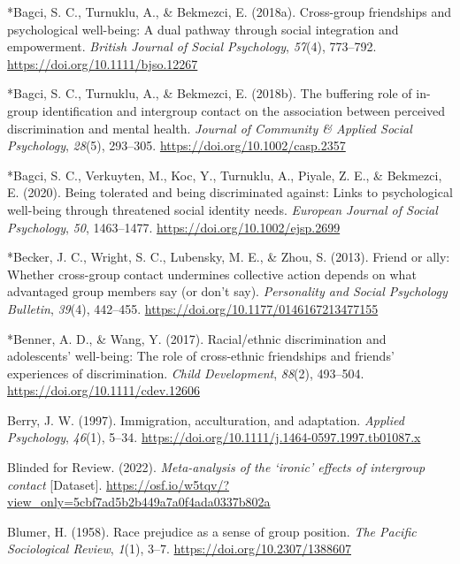 \documentclass[12pt, letterpaper]{article}
\newenvironment{CSLReferences}[2]{}{}
\begin{document}
\begin{CSLReferences}{1}{0}
\leavevmode\hypertarget{ref-414}{}%
*Bagci, S. C., Turnuklu, A., \& Bekmezci, E. (2018a). Cross-group
friendships and psychological well-being: {A} dual pathway through
social integration and empowerment. \emph{British Journal of Social
Psychology}, \emph{57}(4), 773--792.
\url{https://doi.org/10.1111/bjso.12267}

\leavevmode\hypertarget{ref-2257}{}%
*Bagci, S. C., Turnuklu, A., \& Bekmezci, E. (2018b). The buffering role
of in-group identification and intergroup contact on the association
between perceived discrimination and mental health. \emph{Journal of
Community \& Applied Social Psychology}, \emph{28}(5), 293--305.
\url{https://doi.org/10.1002/casp.2357}

\leavevmode\hypertarget{ref-2396}{}%
*Bagci, S. C., Verkuyten, M., Koc, Y., Turnuklu, A., Piyale, Z. E., \&
Bekmezci, E. (2020). Being tolerated and being discriminated against:
Links to psychological well-being through threatened social identity
needs. \emph{European Journal of Social Psychology}, \emph{50},
1463--1477. \url{https://doi.org/10.1002/ejsp.2699}

\leavevmode\hypertarget{ref-2075}{}%
*Becker, J. C., Wright, S. C., Lubensky, M. E., \& Zhou, S. (2013).
Friend or ally: {Whether} cross-group contact undermines collective
action depends on what advantaged group members say (or don't say).
\emph{Personality and Social Psychology Bulletin}, \emph{39}(4),
442--455. \url{https://doi.org/10.1177/0146167213477155}

\leavevmode\hypertarget{ref-1045}{}%
*Benner, A. D., \& Wang, Y. (2017). Racial/ethnic discrimination and
adolescents' well-being: The role of cross-ethnic friendships and
friends' experiences of discrimination. \emph{Child Development},
\emph{88}(2), 493--504. \url{https://doi.org/10.1111/cdev.12606}

\leavevmode\hypertarget{ref-berry_immigration_1997}{}%
Berry, J. W. (1997). Immigration, acculturation, and adaptation.
\emph{Applied Psychology}, \emph{46}(1), 5--34.
\url{https://doi.org/10.1111/j.1464-0597.1997.tb01087.x}

\leavevmode\hypertarget{ref-osf_repository}{}%
Blinded for Review. (2022). \emph{Meta-analysis of the {`ironic'}
effects of intergroup contact} {[}Dataset{]}.
\url{https://osf.io/w5tqv/?view_only=5cbf7ad5b2b449a7a0f4ada0337b802a}

\leavevmode\hypertarget{ref-blumer_race_1958}{}%
Blumer, H. (1958). Race prejudice as a sense of group position.
\emph{The Pacific Sociological Review}, \emph{1}(1), 3--7.
\url{https://doi.org/10.2307/1388607}


\end{CSLReferences}
\end{document}
